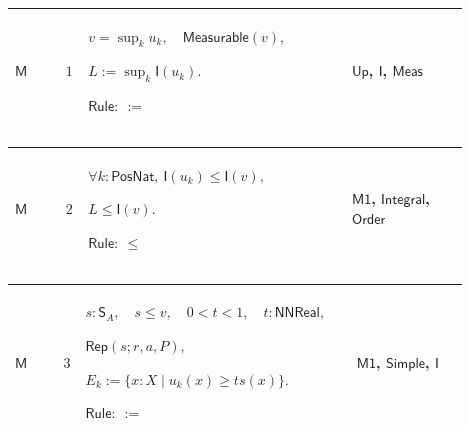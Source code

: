 \documentclass[12pt,reqno]{amsart}
\theoremstyle{blueplain}
\numberwithin{equation}{section}
\begin{document}
{\scriptsize \setlength{\parskip}{0pt}\nointerlineskip
\noindent 
\begin{tabular}{|@{}>{\centering\arraybackslash}m{0.10658\linewidth}|>{\centering\arraybackslash}m{0.03553\linewidth}|>{\centering\arraybackslash}m{0.52105\linewidth}|>{\centering\arraybackslash}m{0.23684\linewidth}|}
\hline
\hypertarget{proof:M1}{$\displaystyle \mathsf{M}$} & $\displaystyle 1$ & $%
\displaystyle v=\sup_k u_k,\quad\mathsf{Measurable}(v),$\par$\displaystyle %
L:=\sup_k\mathsf{I}(u_k).$\par$\displaystyle \mathsf{Rule}:\ :=$ & 
\hyperlink{def:Up}{$\displaystyle \mathsf{Up}$}, \hyperlink{def:I}{$%
\displaystyle \mathsf{I}$}, \hyperlink{lem:Meas}{$\displaystyle \mathsf{Meas}
$} \\ \hline
\end{tabular}%
}

{\scriptsize \setlength{\parskip}{0pt}\nointerlineskip
\noindent 
\begin{tabular}{|@{}>{\centering\arraybackslash}m{0.10658\linewidth}|>{\centering\arraybackslash}m{0.03553\linewidth}|>{\centering\arraybackslash}m{0.52105\linewidth}|>{\centering\arraybackslash}m{0.23684\linewidth}|}
\hline
\hypertarget{proof:M2}{$\displaystyle \mathsf{M}$} & $\displaystyle 2$ & $%
\displaystyle \forall k:\mathsf{PosNat},\ \mathsf{I}(u_k)\le\mathsf{I}(v),$%
\par$\displaystyle L\le\mathsf{I}(v).$\par$\displaystyle \mathsf{Rule}:\ \le$
& \hyperlink{proof:M1}{$\displaystyle \mathsf{M1}$}, \hyperlink{lem:Integral}%
{$\displaystyle \mathsf{Integral}$}, \hyperlink{ax:Order}{$\displaystyle 
\mathsf{Order}$} \\ \hline
\end{tabular}%
}

{\scriptsize \setlength{\parskip}{0pt}\nointerlineskip
\noindent 
\begin{tabular}{|@{}>{\centering\arraybackslash}m{0.10658\linewidth}|>{\centering\arraybackslash}m{0.03553\linewidth}|>{\centering\arraybackslash}m{0.52105\linewidth}|>{\centering\arraybackslash}m{0.23684\linewidth}|}
\hline
\hypertarget{proof:M3}{$\displaystyle \mathsf{M}$} & $\displaystyle 3$ & $%
\displaystyle s:\mathsf{S}_A,\quad s\le v,\quad0<t<1,\quad t:\mathsf{NNReal}%
, $\par$\displaystyle \mathsf{Rep}(s;r,a,P),$\par$\displaystyle %
E_k:=\{x:X\mid u_k(x)\ge ts(x)\}.$\par$\displaystyle \mathsf{Rule}:\ :=$ & 
\hyperlink{proof:M1}{$\displaystyle \mathsf{M1}$}, \hyperlink{def:Simple}{$%
\displaystyle \mathsf{Simple}$}, \hyperlink{def:I}{$\displaystyle \mathsf{I}$%
} \\ \hline
\end{tabular}%
}
\end{document}
